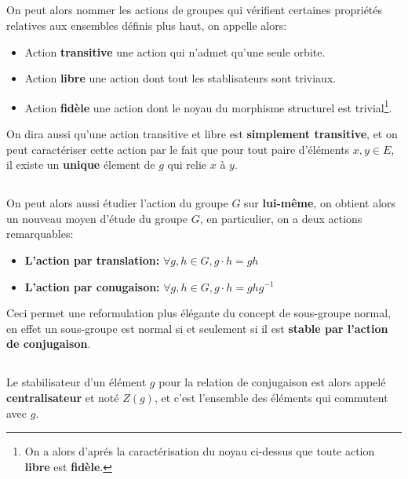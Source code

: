 \subsection*{}
On peut alors nommer les actions de groupes qui vérifient certaines propriétés relatives aux ensembles définis plus haut, on appelle alors:
\begin{itemize}
   \item Action \textbf{transitive} une action qui n'admet qu'une seule orbite.
   \item Action \textbf{libre} une action dont tout les stablisateurs sont triviaux.
   \item Action \textbf{fidèle} une action dont le noyau du morphisme structurel est trivial\footnote[1]{On a alors d'aprés la caractérisation du noyau ci-dessus que toute action \textbf{libre} est \textbf{fidèle}.}.
\end{itemize}
On dira aussi qu'une action transitive et libre est \textbf{simplement transitive}, et on peut caractériser cette action par le fait que pour tout paire d'éléments \( x, y \in E\), il existe un \textbf{unique} élement de \( g \) qui relie \( x \) à \( y \).
\subsection*{}
On peut alors aussi étudier l'action du groupe \( G \) sur \textbf{lui-même}, on obtient alors un nouveau moyen d'étude du groupe \( G \), en particulier, on a deux actions remarquables:
\begin{itemize}
   \item \textbf{L'action par translation:} \( \forall g, h \in G, g \cdot h = gh\)
   \item \textbf{L'action par conugaison:} \( \forall g, h \in G, g \cdot h = ghg^{-1}\)
\end{itemize}
Ceci permet une reformulation plus élégante du concept de sous-groupe normal, en effet un sous-groupe est normal si et seulement si il est \textbf{stable par l'action de conjugaison}.
\pagebreak 

\subsection*{}
Le stabilisateur d'un élément \( g \) pour la relation de conjugaison est alors appelé \textbf{centralisateur} et noté \( Z(g) \), et c'est l'ensemble des éléments qui commutent avec \( g \).\<

